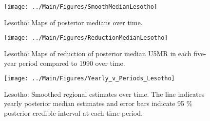 \documentclass[12pt]{article}\usepackage[]{graphicx}\usepackage[]{color}
\newenvironment{knitrout}{}{} %
\begin{document}
\begin{knitrout}
\color{fgcolor}\begin{figure}[bht]

{\centering \texttt{[image: ../Main/Figures/SmoothMedianLesotho]} 

}

\caption[Lesotho]{Lesotho: Maps of posterior medians over time.}\label{fig:unnamed-chunk-174}
\end{figure}


\end{knitrout}
\begin{knitrout}
\color{fgcolor}\begin{figure}[bht]

{\centering \texttt{[image: ../Main/Figures/ReductionMedianLesotho]} 

}

\caption[Lesotho]{Lesotho: Maps of reduction of posterior median U5MR in each five-year period compared to 1990 over time.}\label{fig:unnamed-chunk-175}
\end{figure}


\end{knitrout}
\begin{knitrout}
\color{fgcolor}\begin{figure}[bht]

{\centering \texttt{[image: ../Main/Figures/Yearly\_v\_Periods\_Lesotho]} 

}

\caption[Lesotho]{Lesotho: Smoothed regional estimates over time. The line indicates yearly posterior median estimates and error bars indicate 95 \% posterior credible interval at each time period.}\label{fig:unnamed-chunk-176}
\end{figure}


\end{knitrout}
\end{document}

